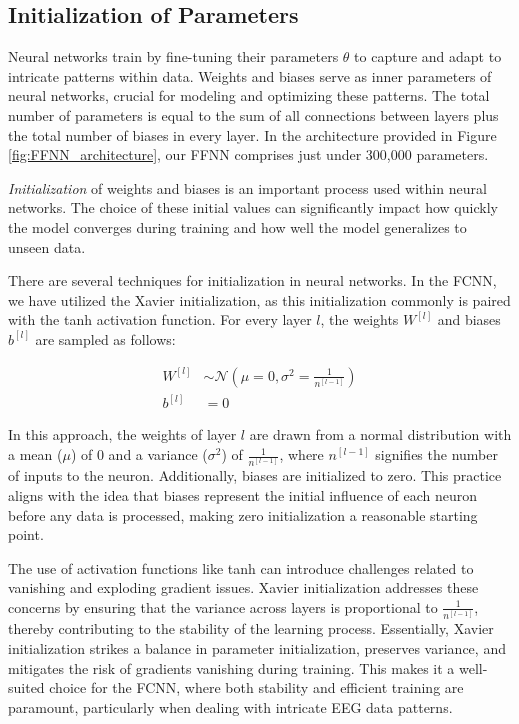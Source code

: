 \documentclass[a4paper, UKenglish, 11pt]{uiomaster}
\begin{document}
\subsection{Initialization of Parameters}
Neural networks train by fine-tuning their parameters $\theta$ to capture and adapt to intricate patterns within data. Weights and biases serve as inner parameters of neural networks, crucial for modeling and optimizing these patterns. The total number of parameters is equal to the sum of all connections between layers plus the total number of biases in every layer. In the architecture provided in Figure \ref{fig:FFNN_architecture}, our FFNN comprises just under 300,000 parameters.

\emph{Initialization} of weights and biases is an important process used within neural networks. The choice of these initial values can significantly impact how quickly the model converges during training and how well the model generalizes to unseen data.

There are several techniques for initialization in neural networks. In the FCNN, we have utilized the Xavier initialization, as this initialization commonly is paired with the tanh activation function. For every layer $l$, the weights $W^{[l]}$ and biases $b^{[l]}$ are sampled as follows:

\begin{align}
W^{[l]} &\sim \mathcal{N}(\mu=0, \sigma^2 = \frac{1}{n^{[l-1]}}) \\
b^{[l]} &= 0
\end{align}

In this approach, the weights of layer $l$ are drawn from a normal distribution with a mean ($\mu$) of 0 and a variance ($\sigma^2$) of $\frac{1}{n^{[l-1]}}$, where $n^{[l-1]}$ signifies the number of inputs to the neuron. Additionally, biases are initialized to zero. This practice aligns with the idea that biases represent the initial influence of each neuron before any data is processed, making zero initialization a reasonable starting point.

The use of activation functions like tanh can introduce challenges related to vanishing and exploding gradient issues. Xavier initialization addresses these concerns by ensuring that the variance across layers is proportional to $\frac{1}{n^{[l-1]}}$, thereby contributing to the stability of the learning process. Essentially, Xavier initialization strikes a balance in parameter initialization, preserves variance, and mitigates the risk of gradients vanishing during training. This makes it a well-suited choice for the FCNN, where both stability and efficient training are paramount, particularly when dealing with intricate EEG data patterns.
\end{document}
